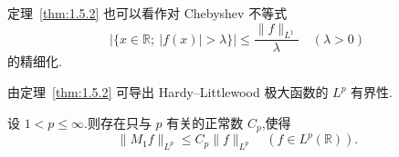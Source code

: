 \begin{note}\label{note:1.5.4}
定理~\ref{thm:1.5.2} 也可以看作对 Chebyshev 不等式
\begin{equation*}
|\{x \in \mathbb{R};\ |f(x)| > \lambda\}| \leq \frac{\| f \|_{L^{1}}}{\lambda} \quad (\lambda > 0)
\end{equation*}
的精细化.
\end{note}

由定理~\ref{thm:1.5.2} 可导出 Hardy--Littlewood 极大函数的 $L^{p}$ 有界性.

\begin{theorem}\label{thm:1.5.5}
设 $1 < p \leq \infty$.则存在只与 $p$ 有关的正常数 $C_{p}$,使得
\begin{equation*}
\| M_{1}f \|_{L^{p}} \leq C_{p}\| f \|_{L^{p}} \quad (f \in L^{p}(\mathbb{R})).
\end{equation*}
\end{theorem}


